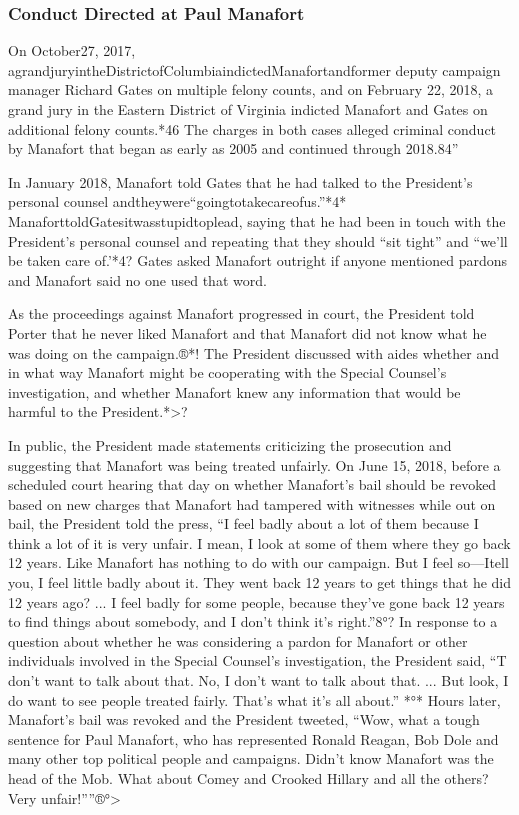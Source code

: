 \subsubsection{Conduct Directed at Paul Manafort}

On October27, 2017, agrandjuryintheDistrictofColumbiaindictedManafortandformer deputy campaign manager Richard Gates on multiple felony counts, and on February 22, 2018, a grand jury in the Eastern District of Virginia indicted Manafort and Gates on additional felony counts.*46
The charges in both cases alleged criminal conduct by Manafort that began as early as 2005 and continued through 2018.84”

In January 2018, Manafort told Gates that he had talked to the President's personal counsel andtheywere“goingtotakecareofus.”*4*
ManaforttoldGatesitwasstupidtoplead, saying that he had been in touch with the President's personal counsel and repeating that they should “sit tight” and “we'll be taken care of.'*4?
Gates asked Manafort outright if anyone mentioned pardons and Manafort said no one used that word.

As the proceedings against Manafort progressed in court, the President told Porter that he never liked Manafort and that Manafort did not know what he was doing on the campaign.®*!
The President discussed with aides whether and in what way Manafort might be cooperating with the Special Counsel's investigation, and whether Manafort knew any information that would be harmful to the President.*>?

In public, the President made statements criticizing the prosecution and suggesting that Manafort was being treated unfairly.
On June 15, 2018, before a scheduled court hearing that day on whether Manafort's bail should be revoked based on new charges that Manafort had tampered with witnesses while out on bail, the President told the press, “I feel badly about a lot of them because I think a lot of it is very unfair.
I mean, I look at some of them where they go back 12 years.
Like Manafort has nothing to do with our campaign.
But I feel so—Itell you, I feel little badly about it.
They went back 12 years to get things that he did 12 years ago? ...
I feel badly for some people, because they've gone back 12 years to find things about somebody, and I don't think it's right.”8°?
In response to a question about whether he was considering a pardon for Manafort or other individuals involved in the Special Counsel's investigation, the President said, “T don't want to talk about that.
No, I don't want to talk about that. ...
But look, I do want to see people treated fairly.
That's what it's all about.” *°*
Hours later, Manafort's bail was revoked and the President tweeted, “Wow, what a tough sentence for Paul Manafort, who has represented Ronald Reagan, Bob Dole and many other top political people and campaigns.
Didn't know Manafort was the head of the Mob.
What about Comey and Crooked Hillary and all the others? Very unfair!””®°>

